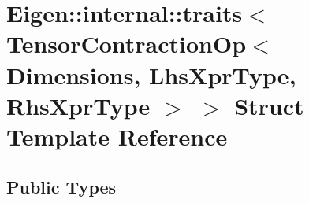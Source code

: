 \hypertarget{struct_eigen_1_1internal_1_1traits_3_01_tensor_contraction_op_3_01_dimensions_00_01_lhs_xpr_type_00_01_rhs_xpr_type_01_4_01_4}{}\section{Eigen\+:\+:internal\+:\+:traits$<$ Tensor\+Contraction\+Op$<$ Dimensions, Lhs\+Xpr\+Type, Rhs\+Xpr\+Type $>$ $>$ Struct Template Reference}
\label{struct_eigen_1_1internal_1_1traits_3_01_tensor_contraction_op_3_01_dimensions_00_01_lhs_xpr_type_00_01_rhs_xpr_type_01_4_01_4}
\subsection*{Public Types}
